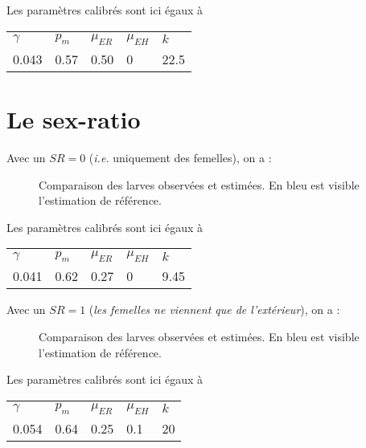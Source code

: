 \documentclass[a4paper, 11pt]{article}
\begin{document}
Les paramètres calibrés sont ici égaux à 

\begin{center}
\begin{tabular}{lllll}
$\gamma$ & $p_m$ & $\mu_{ER}$ & $\mu_{EH}$ & $k$\\
0.043 & 0.57 & 0.50 & 0 & 22.5
\end{tabular}
\end{center}


\newpage
\section{Le sex-ratio}

Avec un $SR = 0$ (\textit{i.e.} uniquement des femelles), on a :
\begin{figure}[h]
 \centering
 \caption{Comparaison des larves observées et estimées. En bleu est visible l'estimation de référence.}
\end{figure}

Les paramètres calibrés sont ici égaux à 

\begin{center}
\begin{tabular}{lllll}
$\gamma$ & $p_m$ & $\mu_{ER}$ & $\mu_{EH}$ & $k$\\
0.041 & 0.62 & 0.27 & 0 & 9.45
\end{tabular}
\end{center}

Avec un $SR = 1$ (\textit{les femelles ne viennent que de l'extérieur}), on a :

\begin{figure}[h]
 \centering
 \caption{Comparaison des larves observées et estimées. En bleu est visible l'estimation de référence.}
\end{figure}

Les paramètres calibrés sont ici égaux à 

\begin{center}
\begin{tabular}{lllll}
$\gamma$ & $p_m$ & $\mu_{ER}$ & $\mu_{EH}$ & $k$\\
0.054 & 0.64 & 0.25 & 0.1 & 20
\end{tabular}
\end{center}






















 
\end{document}
